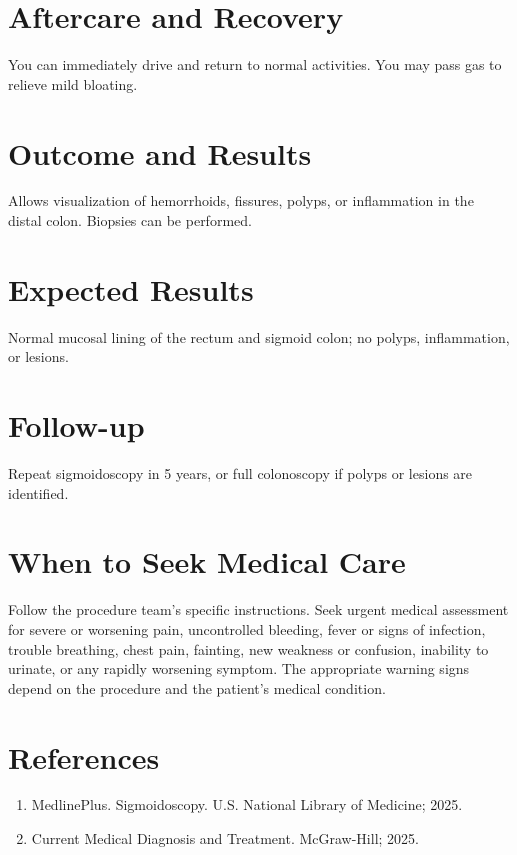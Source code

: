\section*{Aftercare and Recovery}
You can immediately drive and return to normal activities. You may pass gas to relieve mild bloating.

\section*{Outcome and Results}
Allows visualization of hemorrhoids, fissures, polyps, or inflammation in the distal colon. Biopsies can be performed.

\section*{Expected Results}
Normal mucosal lining of the rectum and sigmoid colon; no polyps, inflammation, or lesions.

\section*{Follow-up}
Repeat sigmoidoscopy in 5 years, or full colonoscopy if polyps or lesions are identified.

\section*{When to Seek Medical Care}
Follow the procedure team's specific instructions. Seek urgent medical assessment for severe or worsening pain, uncontrolled bleeding, fever or signs of infection, trouble breathing, chest pain, fainting, new weakness or confusion, inability to urinate, or any rapidly worsening symptom. The appropriate warning signs depend on the procedure and the patient's medical condition.

\section*{References}
\begin{enumerate}
  \item MedlinePlus. Sigmoidoscopy. U.S. National Library of Medicine; 2025.
  \item Current Medical Diagnosis and Treatment. McGraw-Hill; 2025.
\end{enumerate}

\clearpage

